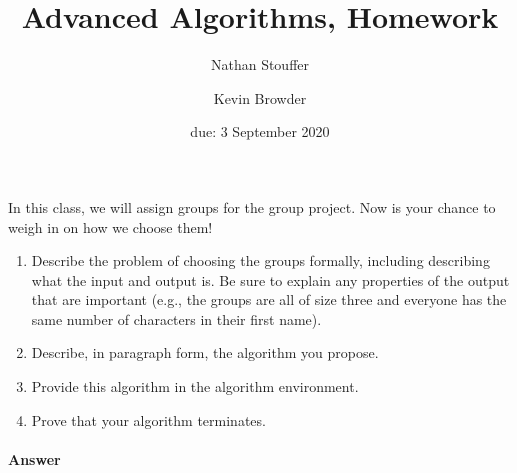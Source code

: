 \documentclass{article}
\title{Advanced Algorithms, Homework \hwnum}
\author{Nathan Stouffer \and Kevin Browder}
\date{due: 3 September 2020}
\begin{document}
\maketitle

\nextprob
{}

In this class, we will assign groups for the group project.  Now is your chance
to weigh in on how we choose them!
\begin{enumerate}
    \item Describe the problem of choosing the groups formally, including
        describing what the input and output is.  Be sure to explain any
        properties of the output that are important (e.g., the groups are all of
        size three and everyone has the same number of characters in their first
        name).
    \item Describe, in paragraph form, the algorithm you propose.
    \item Provide this algorithm in the algorithm environment.
    \item Prove that your algorithm terminates.
\end{enumerate}

\paragraph{Answer}

\end{document}
